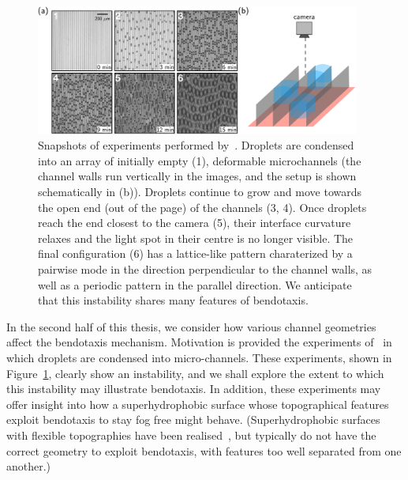 \begin{figure}
\includegraphics[width =0.95\textwidth]{BrinkmannExperiments}
\caption{Snapshots of experiments performed by~\cite{Seemann2011JPhysCondMat}. Droplets are condensed into an array of initially empty (1), deformable microchannels (the channel walls run vertically in the images, and the setup is shown schematically in (b)). Droplets continue to grow and move towards the open end (out of the page) of the channels (3, 4). Once droplets reach the end closest to the camera (5), their interface curvature relaxes and the light spot in their centre is no longer visible. The final configuration (6) has a lattice-like pattern charaterized by a pairwise mode in the direction perpendicular to the channel walls, as well as a periodic pattern in the parallel direction. We anticipate that this instability shares many features of bendotaxis.}\label{fig:Ch1:MBexpts}
\end{figure}

In the second half of this thesis, we consider how various channel geometries affect the bendotaxis mechanism. Motivation is provided the experiments of~\cite{Seemann2011JPhysCondMat} in which droplets are condensed into micro-channels. These experiments, shown in Figure~\ref{fig:Ch1:MBexpts}, clearly show an instability, and we shall explore the extent to which this instability may illustrate bendotaxis. In addition, these experiments may offer insight into how a superhydrophobic surface whose topographical features exploit bendotaxis to stay fog free might behave. (Superhydrophobic surfaces with flexible topographies have been realised~\citep[see][for example]{Blow2010Langmuir}, but typically do not have the correct geometry to exploit bendotaxis, with features too well separated from one another.)


